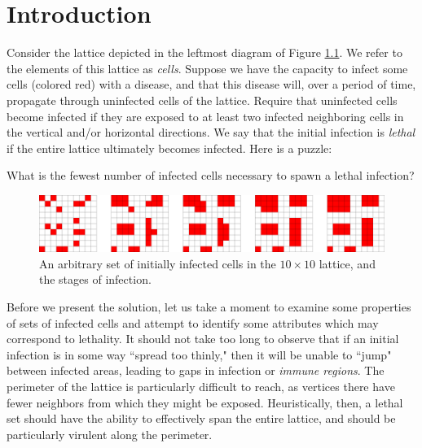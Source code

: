 \chapter{Introduction}

Consider the lattice depicted in the leftmost diagram of Figure \ref{fig:simple_puzzle}. We refer to the elements of this lattice as \emph{cells}. Suppose we have the capacity to infect some cells (colored red) with a disease, and that this disease will, over a period of time, propagate through uninfected cells of the lattice. Require that uninfected cells become infected if they are exposed to at least two infected neighboring cells in the vertical and/or horizontal directions. We say that the initial infection is \emph{lethal} if the entire lattice ultimately becomes infected. Here is a puzzle:

\begin{question}
\label{que:simple_puzzle}
What is the fewest number of infected cells necessary to spawn a lethal infection?
\end{question}

\begin{figure}[]
\centering
\includegraphics[width=\textwidth]{figures/1/simple_puzzle.pdf}
\caption{An arbitrary set of initially infected cells in the $10 \times 10$ lattice, and the stages of infection.}
\label{fig:simple_puzzle}
\end{figure} 

Before we present the solution,
let us take a moment to examine some properties of sets of infected cells and attempt to identify some attributes which may correspond to lethality. It should not take too long to observe that if an initial infection is in some way ``spread too thinly," then it will be unable to ``jump" between infected areas, leading to gaps in infection or \emph{immune regions}. The perimeter of the lattice is particularly difficult to reach, as vertices there have fewer neighbors from which they might be exposed. Heuristically, then, a lethal set should have the ability to effectively span the entire lattice, and should be particularly virulent along the perimeter. 

